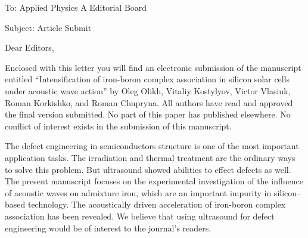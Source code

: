 \documentclass[preprint]{elsarticle}
\begin{document}
To:
Applied Physics A Editorial Board


Subject:
Article Submit

\vspace{5mm}
Dear Editors,

\vspace{3mm}
Enclosed with this letter you will find an electronic submission of the ma\-nu\-script entitled ``Intensification of iron-boron complex association in silicon solar cells under acoustic wave action'' by Oleg Olikh, Vitaliy Kostylyov,
Victor Vlasiuk, Roman Korkishko, and Roman Chupryna.
All authors have read and approved the final version submitted.
No part of this paper has published elsewhere.
No conflict of interest exists in the submission of this manuscript.

The defect engineering in semiconductors structure is one of the most important application tasks. 
The irradiation and thermal treatment are the ordinary ways to solve this problem.
But ultrasound showed abilities to effect defects as well.
The present manuscript focuses on the experimental investigation of the influence of acoustic waves on admixture iron, which are  an important impurity in silicon--based technology.
The acoustically driven acceleration of iron-boron complex association has been revealed. 
We believe that using ultrasound for defect engineering would be of interest to the journal’s readers.




\end{document}
